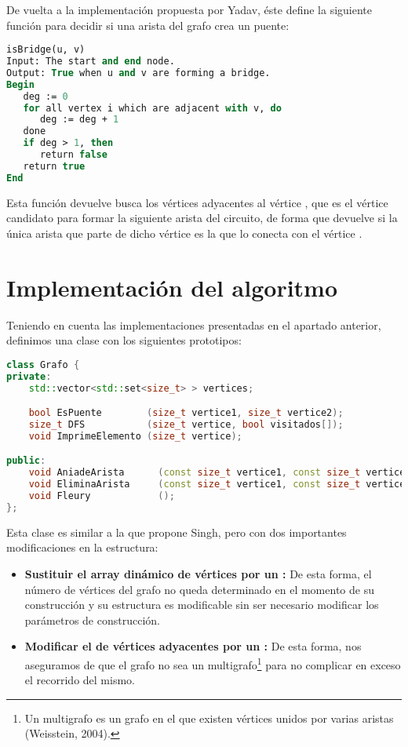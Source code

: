 De vuelta a la implementación propuesta por Yadav, éste define la siguiente función para decidir si una arista del grafo crea un puente:

\begin{lstlisting}[language=Pascal]
isBridge(u, v)
Input: The start and end node.
Output: True when u and v are forming a bridge.
Begin
   deg := 0
   for all vertex i which are adjacent with v, do
      deg := deg + 1
   done
   if deg > 1, then
      return false
   return true
End
\end{lstlisting}

Esta función devuelve busca los vértices adyacentes al vértice , que es el vértice candidato para formar la siguiente arista del circuito, de forma que devuelve  si la única arista que parte de dicho vértice es la que lo conecta con el vértice .

\section{Implementación del algoritmo}\label{voraces-implementacion}

Teniendo en cuenta las implementaciones presentadas en el apartado anterior, definimos una clase  con los siguientes prototipos:

\begin{lstlisting}[language=C++]
class Grafo {
private:
	std::vector<std::set<size_t> > vertices;

	bool EsPuente        (size_t vertice1, size_t vertice2);
	size_t DFS           (size_t vertice, bool visitados[]);
	void ImprimeElemento (size_t vertice);

public:
	void AniadeArista      (const size_t vertice1, const size_t vertice2);
	void EliminaArista     (const size_t vertice1, const size_t vertice2);
	void Fleury            ();
};
\end{lstlisting}

Esta clase es similar a la que propone Singh, pero con dos importantes modificaciones en la estructura:

\begin{itemize}
	\item\textbf{Sustituir el array dinámico de vértices por un :} De esta forma, el número de vértices del grafo no queda determinado en el momento de su construcción y su estructura es modificable sin ser necesario modificar los parámetros de construcción.
	\item\textbf{Modificar el  de vértices adyacentes por un :} De esta forma, nos aseguramos de que el grafo no sea un multigrafo\footnote{%
		Un multigrafo es un grafo en el que existen vértices unidos por varias aristas (Weisstein, 2004).
	} para no complicar en exceso el recorrido del mismo.
\end{itemize}

